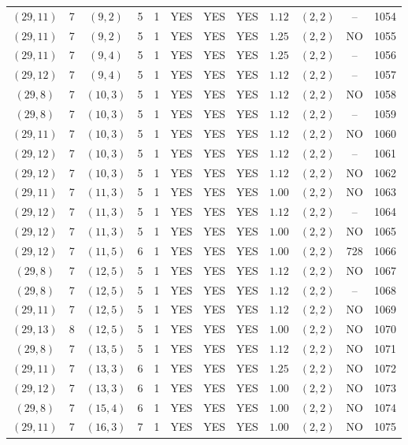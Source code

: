 \begin{longtable}{|c|c|c|c|c|c|c|c|c|c|c|c|}
$(29,11)$ & 7 & $(9,2)$ & 5 & 1 & YES & YES & YES & $1.12$ & $(2,2)$ & -- & 1054\\
$(29,11)$ & 7 & $(9,2)$ & 5 & 1 & YES & YES & YES & $1.25$ & $(2,2)$ & NO & 1055\\
$(29,11)$ & 7 & $(9,4)$ & 5 & 1 & YES & YES & YES & $1.25$ & $(2,2)$ & -- & 1056\\
$(29,12)$ & 7 & $(9,4)$ & 5 & 1 & YES & YES & YES & $1.12$ & $(2,2)$ & -- & 1057\\
$(29,8)$ & 7 & $(10,3)$ & 5 & 1 & YES & YES & YES & $1.12$ & $(2,2)$ & NO & 1058\\
$(29,8)$ & 7 & $(10,3)$ & 5 & 1 & YES & YES & YES & $1.12$ & $(2,2)$ & -- & 1059\\
$(29,11)$ & 7 & $(10,3)$ & 5 & 1 & YES & YES & YES & $1.12$ & $(2,2)$ & NO & 1060\\
$(29,12)$ & 7 & $(10,3)$ & 5 & 1 & YES & YES & YES & $1.12$ & $(2,2)$ & -- & 1061\\
$(29,12)$ & 7 & $(10,3)$ & 5 & 1 & YES & YES & YES & $1.12$ & $(2,2)$ & NO & 1062\\
$(29,11)$ & 7 & $(11,3)$ & 5 & 1 & YES & YES & YES & $1.00$ & $(2,2)$ & NO & 1063\\
$(29,12)$ & 7 & $(11,3)$ & 5 & 1 & YES & YES & YES & $1.12$ & $(2,2)$ & -- & 1064\\
$(29,12)$ & 7 & $(11,3)$ & 5 & 1 & YES & YES & YES & $1.00$ & $(2,2)$ & NO & 1065\\
$(29,12)$ & 7 & $(11,5)$ & 6 & 1 & YES & YES & YES & $1.00$ & $(2,2)$ & 728 & 1066\\
$(29,8)$ & 7 & $(12,5)$ & 5 & 1 & YES & YES & YES & $1.12$ & $(2,2)$ & NO & 1067\\
$(29,8)$ & 7 & $(12,5)$ & 5 & 1 & YES & YES & YES & $1.12$ & $(2,2)$ & -- & 1068\\
$(29,11)$ & 7 & $(12,5)$ & 5 & 1 & YES & YES & YES & $1.12$ & $(2,2)$ & NO & 1069\\
$(29,13)$ & 8 & $(12,5)$ & 5 & 1 & YES & YES & YES & $1.00$ & $(2,2)$ & NO & 1070\\
$(29,8)$ & 7 & $(13,5)$ & 5 & 1 & YES & YES & YES & $1.12$ & $(2,2)$ & NO & 1071\\
$(29,11)$ & 7 & $(13,3)$ & 6 & 1 & YES & YES & YES & $1.25$ & $(2,2)$ & NO & 1072\\
$(29,12)$ & 7 & $(13,3)$ & 6 & 1 & YES & YES & YES & $1.00$ & $(2,2)$ & NO & 1073\\
$(29,8)$ & 7 & $(15,4)$ & 6 & 1 & YES & YES & YES & $1.00$ & $(2,2)$ & NO & 1074\\
$(29,11)$ & 7 & $(16,3)$ & 7 & 1 & YES & YES & YES & $1.00$ & $(2,2)$ & NO & 1075\\

\end{longtable}
